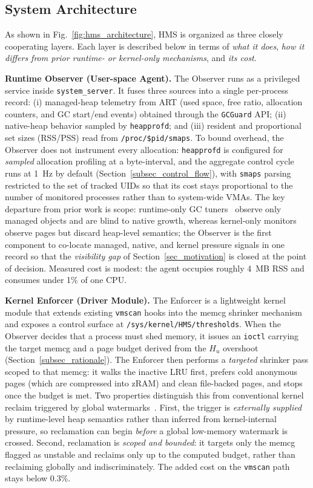  


\subsection{System Architecture}
As shown in Fig.~\ref{fig:hms_architecture}, HMS is organized as three closely cooperating layers. Each layer is described below in terms of \emph{what it does}, \emph{how it differs from prior runtime- or kernel-only mechanisms}, and \emph{its cost}.

\textbf{ Runtime Observer (User-space Agent).}
The Observer runs as a privileged service inside \texttt{system\_server}. It fuses three sources into a single per-process record: (i) managed-heap telemetry from ART (used space, free ratio, allocation counters, and GC start/end events) obtained through the \texttt{GCGuard} API; (ii) native-heap behavior sampled by \texttt{heapprofd}; and (iii) resident and proportional set sizes (RSS/PSS) read from \texttt{/proc/\$pid/smaps}. To bound overhead, the Observer does not instrument every allocation: \texttt{heapprofd} is configured for \emph{sampled} allocation profiling at a byte-interval, and the aggregate control cycle runs at 1~Hz by default (Section~\ref{subsec_control_flow}), with \texttt{smaps} parsing restricted to the set of tracked UIDs so that its cost stays proportional to the number of monitored processes rather than to system-wide VMAs. The key departure from prior work is scope: runtime-only GC tuners~\cite{TC_10045641,TCE_Yan2019_FileAwareGC} observe only managed objects and are blind to native growth, whereas kernel-only monitors observe pages but discard heap-level semantics; the Observer is the first component to co-locate managed, native, and kernel pressure signals in one record so that the \emph{visibility gap} of Section~\ref{sec_motivation} is closed at the point of decision. Measured cost is modest: the agent occupies roughly 4~MB RSS and consumes under 1\% of one CPU.

\textbf{ Kernel Enforcer (Driver Module).}
The Enforcer is a lightweight kernel module that extends existing \texttt{vmscan} hooks into the memcg shrinker mechanism and exposes a control surface at \texttt{/sys/kernel/HMS/thresholds}. When the Observer decides that a process must shed memory, it issues an \texttt{ioctl} carrying the target memcg and a page budget derived from the $H_u$ overshoot (Section~\ref{subsec_rationale}). The Enforcer then performs a \emph{targeted} shrinker pass scoped to that memcg: it walks the inactive LRU first, prefers cold anonymous pages (which are compressed into zRAM) and clean file-backed pages, and stops once the budget is met. Two properties distinguish this from conventional kernel reclaim triggered by global watermarks~\cite{TC_9513533,TC_10851391}. First, the trigger is \emph{externally supplied} by runtime-level heap semantics rather than inferred from kernel-internal pressure, so reclamation can begin \emph{before} a global low-memory watermark is crossed. Second, reclamation is \emph{scoped and bounded}: it targets only the memcg flagged as unstable and reclaims only up to the computed budget, rather than reclaiming globally and indiscriminately. The added cost on the \texttt{vmscan} path stays below 0.3\%.

